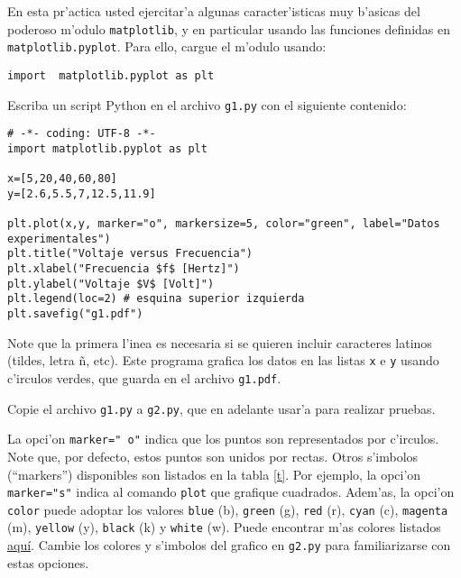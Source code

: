 \documentclass[11pt]{exam}
\begin{document}
\firstpageheadrule
\runningheadrule
{}
\cfoot{ }
\begin{flushleft}
\vspace{0.2in}
\vspace{0.25cm}
\end{flushleft}

\begin{questions}

\item En esta pr'actica usted ejercitar'a algunas caracter'isticas muy b'asicas del  poderoso m'odulo \texttt{matplotlib}, y en particular usando las funciones definidas en \texttt{matplotlib.pyplot}. Para ello, cargue el m'odulo usando:
\begin{verbatim}
import  matplotlib.pyplot as plt
\end{verbatim}
\item Escriba un script Python en el archivo \texttt{g1.py} con el siguiente contenido:
\begin{verbatim}
# -*- coding: UTF-8 -*-
import matplotlib.pyplot as plt

x=[5,20,40,60,80]
y=[2.6,5.5,7,12.5,11.9]

plt.plot(x,y, marker="o", markersize=5, color="green", label="Datos experimentales")
plt.title("Voltaje versus Frecuencia")
plt.xlabel("Frecuencia $f$ [Hertz]")
plt.ylabel("Voltaje $V$ [Volt]")
plt.legend(loc=2) # esquina superior izquierda
plt.savefig("g1.pdf")
\end{verbatim}
Note que la primera l'inea es necesaria si se quieren incluir caracteres latinos (tildes, letra \~n, etc). Este programa grafica los datos en las listas \texttt{x} e \texttt{y} usando c'irculos verdes, que guarda en el archivo \texttt{g1.pdf}.
\item Copie el archivo \texttt{g1.py} a \texttt{g2.py}, que en adelante usar'a para realizar pruebas. 
\item La opci'on \texttt{marker="\,o"} indica que los puntos son representados por c'irculos. Note que, por defecto, estos puntos son unidos por rectas. Otros s'imbolos (``markers'') disponibles son listados en la tabla \ref{t}. Por ejemplo, la opci'on \texttt{marker="s"} indica al comando \texttt{plot} que grafique cuadrados. 
Adem'as, la opci'on \texttt{color} puede adoptar los valores \texttt{blue} (b), \texttt{green} (g), \texttt{red} (r), \texttt{cyan} (c), \texttt{magenta} (m), \texttt{yellow} (y), \texttt{black} (k) y \texttt{white} (w). Puede encontrar m'as colores listados \href{http://matplotlib.org/examples/color/named_colors.html}{aqu\'i}. Cambie los colores y s'imbolos del grafico en \texttt{g2.py} para familiarizarse con estas opciones.


\end{questions}
\end{document}
